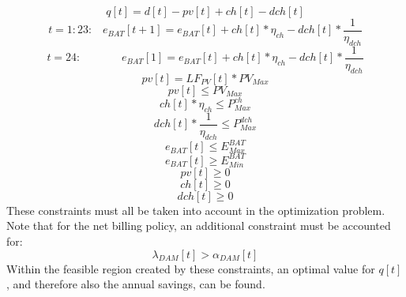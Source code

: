 \begin{equation} \label{1}
    q[t] = d[t] - pv[t] + ch[t] - dch[t]    
\end{equation}
\begin{equation} \label{2}
    t = 1:23: \;\;\; e_{BAT}[t+1] = e_{BAT}[t] + ch[t]*\eta_{ch} - dch[t]*\frac{1}{\eta_{dch}}
\end{equation}
\begin{equation} \label{20}
    t = 24: \;\;\;\;\;\;\;\;\;\;\;\;\; e_{BAT}[1] = e_{BAT}[t] + ch[t]*\eta_{ch} - dch[t]*\frac{1}{\eta_{dch}}
\end{equation}
\begin{equation} \label{3}
    pv[t] = LF_{PV}[t]*PV_{Max}
\end{equation}
\begin{equation} \label{4}
    pv[t] \leq PV_{Max}
\end{equation}
\begin{equation} \label{5}
    ch[t]*\eta_{ch} \leq P_{Max}^{ch}
\end{equation}
\begin{equation} \label{6}
    dch[t]*\frac{1}{\eta_{dch}} \leq P_{Max}^{dch}
\end{equation}
\begin{equation} \label{7}
    e_{BAT}[t] \leq E_{Max}^{BAT}
\end{equation}
\begin{equation} \label{8}
    e_{BAT}[t] \geq E_{Min}^{BAT}
\end{equation}
\begin{equation} \label{9}
    pv[t] \geq 0
\end{equation}
\begin{equation} \label{10}
    ch[t] \geq 0
\end{equation}
\begin{equation} \label{11}
    dch[t] \geq 0
\end{equation}
These constraints must all be taken into account in the optimization problem. Note that for the net billing policy, an additional constraint must be accounted for:
\begin{equation} \label{rvw5}
	\lambda_{DAM}[t] > \alpha_{DAM}[t]
\end{equation}
Within the feasible region created by these constraints, an optimal value for $q[t]$, and therefore also the annual savings, can be found.
